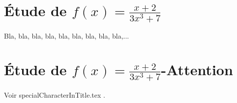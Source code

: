 \documentclass{article}
\begin{document}
\section{Étude de \texorpdfstring{$f(x)=\frac{x+2}{3 x^3+7}$}{f(x)=(x+2) / (3 x**3+7)}}

Bla, bla, bla, bla, bla, bla, bla, bla, bla,...


\section{Étude de \texorpdfstring{$f(x)=\frac{x+2}{3 x^3+7}$}{f(x)=(x+2) / (3 x^3+7)}-Attention}

Voir specialCharacterInTitle.tex .
\end{document}
